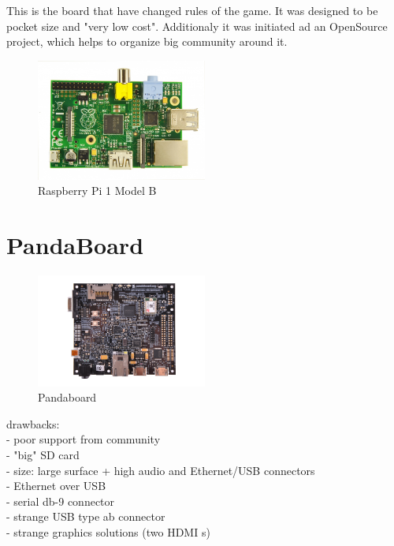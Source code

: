 \documentclass[printmode]{mgr}
\begin{document}
This is the board that have changed rules of the game.
It was designed to be pocket size and "very low cost".
Additionaly it was initiated ad an OpenSource project, which helps to organize big community around it.


\begin{figure}[htbp]
  \centering
    \includegraphics[width=0.5\textwidth]{raspberrypi-front.jpg}
  \caption{Raspberry Pi 1 Model B}
  \label{fig:devboard-raspberrypi}
\end{figure}

\section{PandaBoard}

\begin{figure}[htbp]
  \centering
    \includegraphics[width=0.5\textwidth]{pandaboard-front.png}
  \caption{Pandaboard}
  \label{fig:devboard-pandaboard}
\end{figure}

drawbacks:\\
- poor support from community\\
- "big" SD card\\
- size: large surface + high audio and Ethernet/USB connectors\\
- Ethernet over USB\\
- serial db-9 connector\\
- strange USB type ab connector\\
- strange graphics solutions (two HDMI s)\\
\end{document}
